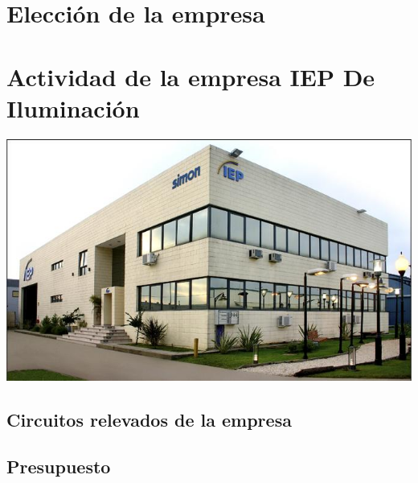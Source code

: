 \documentclass[12pt,titlepage]{report}
\begin{document}
\chapter{Elección de la empresa}



\chapter{Actividad de la empresa IEP De Iluminación}

\begin{center}
 \includegraphics[scale=0.75]{./Images/iep-instalacion.png}
\end{center}



\pagebreak
\section{Circuitos relevados de la empresa}

\pagebreak

\pagebreak


\pagebreak
\section{Presupuesto}

\end{document}
